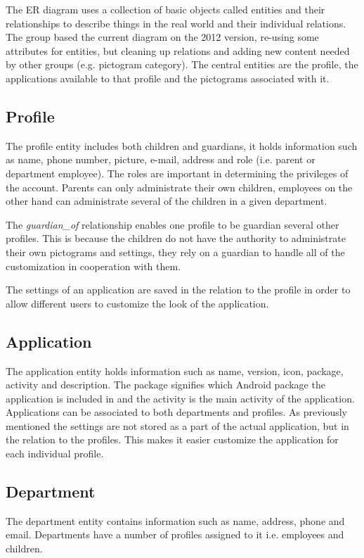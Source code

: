 The ER diagram uses a collection of basic objects called entities and their relationships to describe things in the real world and their individual relations. The group based the current diagram on the 2012 version, re-using some attributes for entities, but cleaning up relations and adding new content needed by other groups (e.g. pictogram category).  The central entities are the profile, the applications available to that profile and the pictograms associated with it. 

\subsection{Profile}
The profile entity includes both children and guardians, it holds information such as name, phone number, picture, e-mail, address and role (i.e. parent or department employee). The roles are important in determining the privileges of the account. Parents can only administrate their own children, employees on the other hand can administrate several of the children in a given department. 

The \emph{guardian\_of} relationship enables one profile to be guardian several other profiles. This is because the children do not have the authority to administrate their own pictograms and settings, they rely on a guardian to handle all of the customization in cooperation with them. 

The settings of an application are saved in the relation to the profile in order to allow different users to customize the look of the application.

\subsection{Application}
The application entity holds information such as name, version, icon, package, activity and description. 
The package signifies which Android package the application is included in and the activity is the main activity of the application. Applications can be associated to both departments and profiles. As previously mentioned the settings are not stored as a part of the actual application, but in the relation to the profiles. This makes it easier customize the application for each individual profile.
 
\subsection{Department}
The department entity contains information such as name, address, phone and email. Departments have a number of profiles assigned to it i.e. employees and children.

